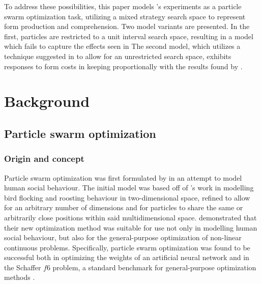 \documentclass[12pt]{article}
\begin{document}
To address these possibilities, this paper models \citeauthor{rohde2012}'s experiments as a particle swarm optimization task, utilizing a mixed strategy search space to represent form production and comprehension. Two model variants are presented. In the first, particles are restricted to a unit interval search space, resulting in a model which fails to capture the effects seen in \citeauthor{rohde2012} The second model, which utilizes a technique suggested in \citealt[p. 252]{engelbrecht2005} to allow for an unrestricted search space, exhibits responses to form costs in keeping proportionally with the results found by \citeauthor{rohde2012}.



\section{Background}
\subsection{Particle swarm optimization}
\subsubsection{Origin and concept}
Particle swarm optimization was first formulated by \cite{kennedy1995}
in an attempt to model human social behaviour. The initial model was based off of \cite{heppner1990}'s
work in modelling bird flocking and roosting behaviour in two-dimensional space, refined to allow for an arbitrary number of dimensions and for particles to share the same or arbitrarily close positions within said multidimensional space. \cite{kennedy1995}
demonstrated that their new optimization method was suitable for use not only in modelling human social behaviour, but also for the general-purpose optimization of non-linear continuous problems. Specifically, particle swarm optimization was found to be successful both in optimizing the weights of an artificial neural network and in the Schaffer $f6$ problem, a standard benchmark for general-purpose optimization methods \cite{davis1991}.
\end{document}
